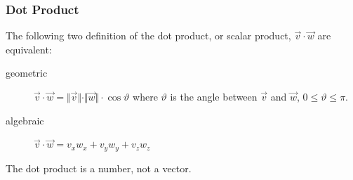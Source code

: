\documentclass[xcolor=dvipsnames]{beamer}
\begin{document}


\begin{frame}
  \frametitle{Dot Product}
  The following two definition of the \alert{dot product}, or
  \alert{scalar product}, $\vec{v}\cdot\vec{w}$ are equivalent:
  \begin{description}
  \item[geometric]
    $\vec{v}\cdot\vec{w}=\Vert\vec{v}\Vert\cdot\Vert\vec{w}\Vert\cdot\cos\vartheta$
    where $\vartheta$ is the angle between $\vec{v}$ and $\vec{w}$,
    $0\leq\vartheta\leq\pi$.
  \item[algebraic] $\vec{v}\cdot\vec{w}=v_{x}w_{x}+v_{y}w_{y}+v_{z}w_{z}$
  \end{description}
The dot product is a number, not a vector.
\end{frame}
\end{document}
